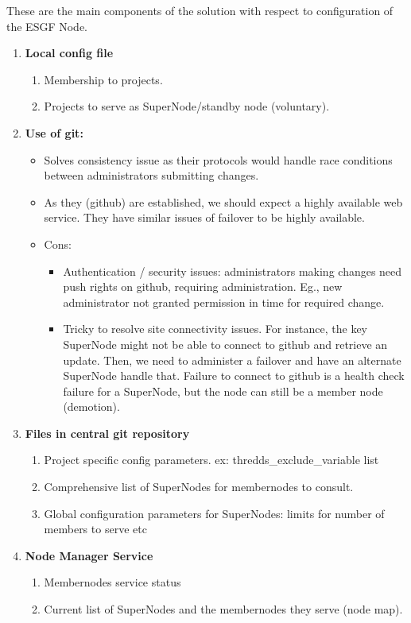 \documentclass[oneside,12pt]{memoir}
\begin{document}
These are the main components of the solution with respect to configuration of the ESGF Node.
\begin{enumerate}
\item
\textbf{Local config file} 
\begin{enumerate}
\item Membership to projects.
\item Projects to serve as SuperNode/standby node (voluntary).


\end{enumerate}

\item
\textbf{Use of git:  }

\begin{itemize}
\item
Solves consistency issue as their protocols would handle race conditions between administrators submitting changes. 
\item
As they (github) are established, we should expect a highly available web service.  They have similar issues of failover to be highly available.
\item
Cons:
\begin{itemize}
\item
 Authentication / security issues: administrators making changes need push rights on github, requiring administration.  Eg., new administrator not granted permission in time for required change.
 \item
 Tricky to resolve site connectivity issues.  For instance, the key SuperNode might not be able to connect to github and retrieve an update.  Then, we need to administer a failover and have an alternate SuperNode handle that.  Failure to connect to github is a health check failure for a SuperNode, but the node can still be a member node (demotion).  
\end{itemize}
\end{itemize}



\item \textbf{Files in central git repository}
\begin{enumerate}
\item Project specific config parameters. ex: thredds\_exclude\_variable list
\item Comprehensive list of SuperNodes for membernodes to consult.
\item Global configuration parameters for SuperNodes: limits for number of members to serve etc
\end{enumerate}
\item \textbf{Node Manager Service}
\begin{enumerate}
\item Membernodes service status
\item Current list of SuperNodes and the membernodes they serve (node map).
\end{enumerate}


\end{enumerate}
\end{document}
